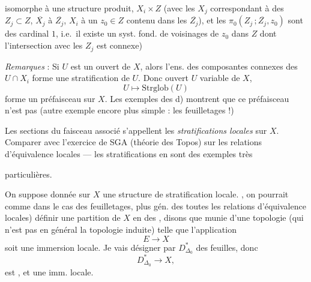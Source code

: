 \documentclass[11pt,a4paper]{article}
\begin{document}


isomorphe à une structure produit, $X_i \times Z$ (avec les $X_j$ correspondant à des $Z_j \subset Z$, $\overline{X_j}$ à $\overline{Z_j}$, $X_i$ à un $z_0 \in Z$ contenu dans les $\overline{Z_j}$), et les $\pi_0(Z_j\,;\overline{Z_j},z_0)$ sont des \add{\ill{}} cardinal $1$, i.e.\ il existe un syst. fond. de voisinages de $z_0$ dans $Z$ dont l'intersection avec les $Z_j$ est connexe)

\emph{Remarques} : Si $U$ est un ouvert de $X$, alors l'ens. des composantes connexes des $U \cap X_i$ forme \add{\ill{}} une stratification  de $U$. Donc   ouvert $U$ variable de $X$,
\[
  U \longmapsto \mathrm{Strglob}(U)
\]
forme un préfaisceau sur $X$. Les exemples des d) montrent que ce préfaisceau n'est pas \struck{\ill{}}  (autre exemple encore plus simple : les feuilletages !)


Les sections du faisceau associé s'appellent les  \emph{stratifications locales} sur $X$. Comparer avec l'exercice de SGA (théorie des Topos) sur les relations d'équivalence locales --- les stratifications en sont des exemples très


particulières.


On suppose donnée sur $X$ une structure de stratification locale. , on pourrait comme dans le cas des feuilletages, plus gén. des toutes les relations d'équivalence locales) définir  une partition de $X$ en des  , disons que    munie d'une topologie (qui n'est pas en général la topologie induite) telle que l'application
\[
  E \longrightarrow X \tag{296}
\]
soit une immersion locale. Je vais désigner par $D^{*}_{\Delta_0}$   \ill{} des feuilles, donc
\[
  D^{*}_{\Delta_0} \longrightarrow X , \tag{297}
\]
\struck{\ill{}} est , et une imm. locale.
\end{document}

